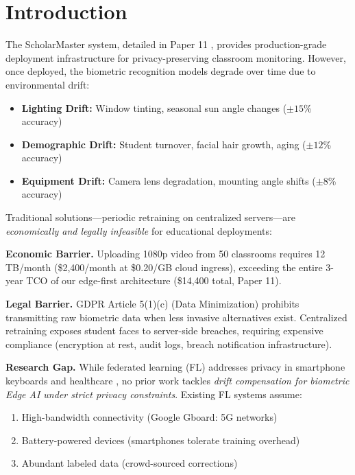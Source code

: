 \documentclass[conference]{IEEEtran}
\begin{document}
\section{Introduction}

The ScholarMaster system, detailed in Paper 11 \cite{paper11}, provides production-grade deployment infrastructure for privacy-preserving classroom monitoring. However, once deployed, the biometric recognition models  degrade over time due to environmental drift:

\begin{itemize}
    \item \textbf{Lighting Drift:} Window tinting, seasonal sun angle changes ($\pm 15$\% accuracy)
    \item \textbf{Demographic Drift:} Student turnover, facial hair growth, aging ($\pm 12$\% accuracy)
    \item \textbf{Equipment Drift:} Camera lens degradation, mounting angle shifts ($\pm 8$\% accuracy)
\end{itemize}

Traditional solutions—periodic retraining on centralized servers—are \textit{economically and legally infeasible} for educational deployments:

\textbf{Economic Barrier.} Uploading 1080p video from 50 classrooms requires 12 TB/month (\$2,400/month at \$0.20/GB cloud ingress), exceeding the entire 3-year TCO of our edge-first architecture (\$14,400 total, Paper 11).

\textbf{Legal Barrier.} GDPR Article 5(1)(c) (Data Minimization) prohibits transmitting raw biometric data when less invasive alternatives exist. Centralized retraining exposes student faces to server-side breaches, requiring expensive compliance (encryption at rest, audit logs, breach notification infrastructure).

\textbf{Research Gap.} While federated learning (FL) addresses privacy in smartphone keyboards \cite{mcmahan2017} and healthcare \cite{rieke2020}, no prior work tackles \textit{drift compensation for biometric Edge AI under strict privacy constraints}. Existing FL systems assume:
\begin{enumerate}
    \item High-bandwidth connectivity (Google Gboard: 5G networks)
    \item Battery-powered devices (smartphones tolerate training overhead)
    \item Abundant labeled data (crowd-sourced corrections)
\end{enumerate}
\end{document}
